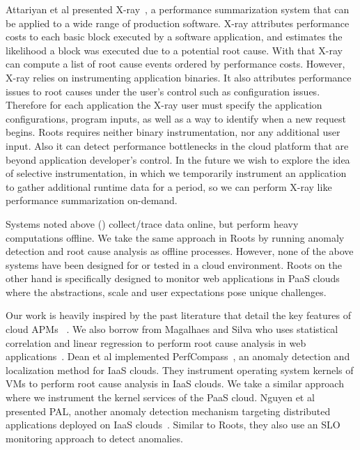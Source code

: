 Attariyan et al presented X-ray~\cite{Attariyan:2012:XAR:2387880.2387910}, 
a performance summarization system that can be applied
to a wide range of production software. X-ray attributes performance costs to each
basic block executed by a software application, and estimates the likelihood a block
was executed due to a potential root cause. With that X-ray can compute a list of root cause
events ordered by performance costs. However, X-ray relies on instrumenting application
binaries. It also attributes performance
issues to root causes under the user's control such as configuration issues.
Therefore for each application the X-ray user must specify the application configurations,
program inputs, 
as well as a way to identify when a new request begins. Roots requires neither binary
instrumentation, nor any additional user input. Also it can detect performance bottlenecks
in the cloud platform that are beyond application developer's control. In the
future we wish to explore the idea of selective instrumentation, in which
we temporarily instrument an application to gather additional runtime data for a period, so
we can perform X-ray like performance summarization on-demand.

Systems noted above (\cite{Chen:2002:PPD:647883.738238,Aguilera:2003:PDD:945445.945454,Attariyan:2012:XAR:2387880.2387910}) 
collect/trace data online, but perform heavy computations
offline. We take the same approach in Roots by running anomaly detection
and root cause analysis as offline processes. However, none of the above
systems have been designed for or tested in a cloud environment. Roots on
the other hand is specifically designed to monitor web applications in
PaaS clouds where the abstractions, scale and user expectations pose unique challenges.

Our work is heavily inspired by the past literature that detail the key features of 
cloud APMs~\cite{DaCunhaRodrigues:2016:MCC:2851613.2851619,Ibidunmoye:2015:PAD:2808687.2791120} . 
We also borrow from
Magalhaes and Silva who uses statistical correlation and linear regression to perform
root cause analysis in web applications~\cite{Magalhaes:2010:DPA:1906485.1906774, Magalhaes:2011:RAP:1982185.1982234}. 
Dean et al implemented PerfCompass~\cite{Dean:2014:PTR:2696535.2696551}, 
an anomaly detection and localization method for IaaS clouds. They instrument operating system kernels
of VMs to perform root cause analysis in IaaS clouds. We take a similar approach where we instrument
the kernel services of the PaaS cloud.
Nguyen et al presented PAL, another anomaly detection mechanism targeting
distributed applications deployed on IaaS clouds~\cite{Nguyen:2011:PPR:2038633.2038634}. 
Similar to Roots, they also use an SLO monitoring approach to detect anomalies.